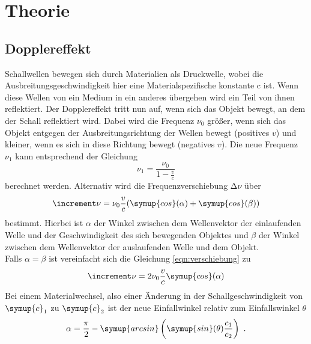 \section{Theorie}
\label{sec:Theorie}

\subsection{Dopplereffekt}

    Schallwellen bewegen sich durch Materialien als Druckwelle, wobei die Ausbreitungsgeschwindigkeit hier eine
    Materialspezifische konstante c ist. Wenn diese Wellen von ein Medium in ein anderes übergehen wird ein Teil von
    ihnen reflektiert. Der Dopplereffekt tritt nun auf, wenn sich das Objekt bewegt, an dem der Schall reflektiert wird.
    Dabei wird die Frequenz $\nu_0$ größer, wenn sich das Objekt entgegen der Ausbreitungsrichtung der Wellen bewegt 
    (positives $v$) und kleiner, wenn es sich in diese Richtung bewegt (negatives $v$). Die neue Frequenz $\nu_1$ kann 
    entsprechend der Gleichung
    \begin{equation}
        \nu_1=\frac{\nu_0}{1-\frac{v}{c}}
        \label{eqn:doppler}
    \end{equation}
    \noindent berechnet werden. Alternativ wird die Frequenzverschiebung $\increment \nu$ über
    \begin{equation}
        \increment \nu=\nu_0\frac{v}{c}(\symup{cos}(\alpha)+\symup{cos}(\beta))
        \label{eqn:verschiebung}
    \end{equation}
    bestimmt. Hierbei ist $\alpha$ der Winkel zwischen dem Wellenvektor der einlaufenden Welle und der Geschwindigkeit
    des sich bewegenden Objektes und $\beta$ der Winkel zwischen dem Wellenvektor der auslaufenden Welle und dem Objekt.\\
    \noindent Falls $\alpha=\beta$ ist vereinfacht sich die Gleichung \ref{eqn:verschiebung} zu
    \begin{equation}
        \increment \nu=2\nu_0\frac{v}{c}\symup{cos}(\alpha)
        \label{eqn:verschiebung2}
    \end{equation}
    \noindent Bei einem Materialwechsel, also einer Änderung in der Schallgeschwindigkeit von $\symup{c}_1$ zu $\symup{c}_2$
    ist der neue Einfallwinkel relativ zum Einfallswinkel $\theta$
    \begin{equation}
        \alpha=\frac{\pi}{2}-\symup{arcsin}\left(\symup{sin}(\theta)\frac{c_1}{c_2}\right) \text{ .}
        \label{eqn:winkel}
    \end{equation}
    
